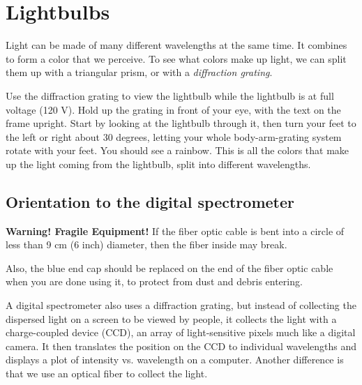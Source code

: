 \section{Lightbulbs}

Light can be made of many different wavelengths at the same time. It combines to form a color that we perceive. To see what colors make up light, we can split them up with a triangular prism, or with a \textit{diffraction grating}.

\begin{steps}
	\item Use the diffraction grating to view the lightbulb while the lightbulb is at full voltage (120 V). Hold up the grating in front of your eye, with the text on the frame upright. Start by looking at the lightbulb through it, then turn your feet to the left or right about 30 degrees, letting your whole body-arm-grating system rotate with your feet. You should see a rainbow. This is all the colors that make up the light coming from the lightbulb, split into different wavelengths.
\end{steps}

\subsection{Orientation to the digital spectrometer}

\begin{framed}
	\textbf{Warning! Fragile Equipment!} If the fiber optic cable is bent into a circle of less than 9 cm (6 inch) diameter, then the fiber inside may break.
	
	Also, the blue end cap should be replaced on the end of the fiber optic cable when you are done using it, to protect from dust and debris entering.
\end{framed}

A digital spectrometer also uses a diffraction grating, but instead of collecting the dispersed light on a screen to be viewed by people, it collects the light with a charge-coupled device (CCD), an array of light-sensitive pixels much like a digital camera. It then translates the position on the CCD to individual wavelengths and displays a plot of intensity vs. wavelength on a computer. %
Another difference is that we use an optical fiber to collect the light.

